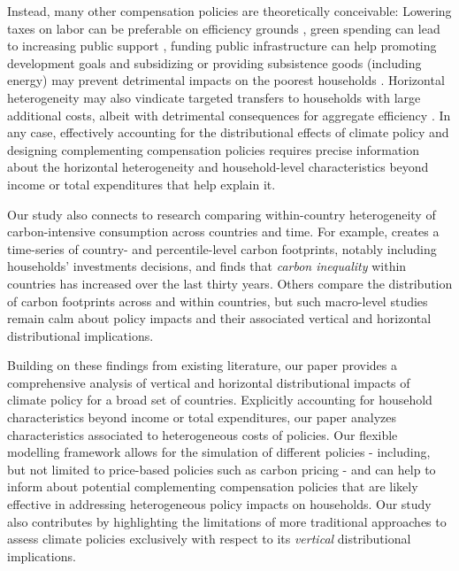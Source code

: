 \documentclass[12pt, a4paper]{article}
\begin{document}
Instead, many other compensation policies are theoretically conceivable: Lowering taxes on labor can be preferable on efficiency grounds \autocite{Pearce.1991,Goulder.1995,Bento.2018}, green spending can lead to increasing public support \autocite{Sommer.2022,Kotchen.2017,Dechezlepretre.2022}, funding public infrastructure can help promoting development goals \autocite{Franks.2018,Jakob.2016} and subsidizing or providing subsistence goods (including energy) may prevent detrimental impacts on the poorest households \autocite{Greve.2022,Schaffitzel.2019}. Horizontal heterogeneity may also vindicate targeted transfers to households with large additional costs, albeit with detrimental consequences for aggregate efficiency \autocite{Hansel.2022}. In any case, effectively accounting for the distributional effects of climate policy and designing complementing compensation policies requires precise information about the horizontal heterogeneity and household-level characteristics beyond income or total expenditures that help explain it. 

Our study also connects to research comparing within-country heterogeneity of carbon-intensive consumption across countries and time. For example, \textcite{Chancel.2022b} creates a time-series of country- and percentile-level carbon footprints, notably including households' investments decisions, and finds that \textit{carbon inequality} within countries has increased over the last thirty years. Others \autocite{Oswald.2020,Bruckner.2022} compare the distribution of carbon footprints across and within countries, but such macro-level studies remain calm about policy impacts and their associated vertical and horizontal distributional implications.

Building on these findings from existing literature, our paper provides a comprehensive analysis of vertical and horizontal distributional impacts of climate policy for a broad set of countries. Explicitly accounting for household characteristics beyond income or total expenditures, our paper analyzes characteristics associated to heterogeneous costs of policies. Our flexible modelling framework allows for the simulation of different policies - including, but not limited to price-based policies such as carbon pricing - and can help to inform about potential complementing compensation policies that are likely effective in addressing heterogeneous policy impacts on households. Our study also contributes by highlighting the limitations of more traditional approaches to assess climate policies exclusively with respect to its \textit{vertical} distributional implications.
\end{document}
